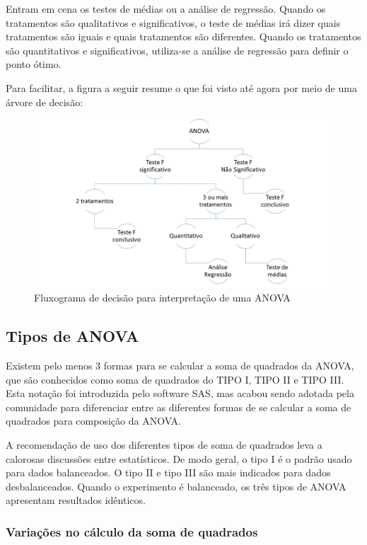 \documentclass[
]{article}
\begin{document}
Entram em cena os testes de médias ou a análise de regressão. Quando os tratamentos são qualitativos e significativos, o teste de médias irá dizer quais tratamentos são iguais e quais tratamentos são diferentes. Quando os tratamentos são quantitativos e significativos, utiliza-se a análise de regressão para definir o ponto ótimo.

Para facilitar, a figura a seguir resume o que foi visto até agora por meio de uma árvore de decisão:

\begin{figure}
\centering
\includegraphics{./figuras/resumo_anova.png}
\caption{Fluxograma de decisão para interpretação de uma ANOVA}
\end{figure}

\hypertarget{tipos-de-anova}{%
\subsection{Tipos de ANOVA}\label{tipos-de-anova}}

Existem pelo menos 3 formas para se calcular a soma de quadrados da ANOVA, que são conhecidos como soma de quadrados do TIPO I, TIPO II e TIPO III. Esta notação foi introduzida pelo software SAS, mas acabou sendo adotada pela comunidade para diferenciar entre as diferentes formas de se calcular a soma de quadrados para composição da ANOVA.

A recomendação de uso dos diferentes tipos de soma de quadrados leva a calorosas discussões entre estatísticos. De modo geral, o tipo I é o padrão usado para dados balanceados. O tipo II e tipo III são mais indicados para dados desbalanceados. Quando o experimento é balanceado, os três tipos de ANOVA apresentam resultados idênticos.

\hypertarget{variauxe7uxf5es-no-cuxe1lculo-da-soma-de-quadrados}{%
\subsubsection{Variações no cálculo da soma de quadrados}\label{variauxe7uxf5es-no-cuxe1lculo-da-soma-de-quadrados}}
\end{document}
